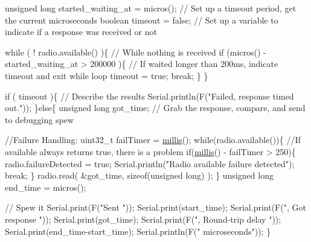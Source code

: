 \begin{DoxyCodeInclude}
    \textcolor{keywordtype}{unsigned} \textcolor{keywordtype}{long} started\_waiting\_at = micros();               \textcolor{comment}{// Set up a timeout period, get the current
       microseconds}
    \textcolor{keywordtype}{boolean} timeout = \textcolor{keyword}{false};                                   \textcolor{comment}{// Set up a variable to indicate if a
       response was received or not}
    
    \textcolor{keywordflow}{while} ( ! radio.available() )\{                             \textcolor{comment}{// While nothing is received}
      \textcolor{keywordflow}{if} (micros() - started\_waiting\_at > 200000 )\{            \textcolor{comment}{// If waited longer than 200ms, indicate
       timeout and exit while loop}
          timeout = \textcolor{keyword}{true};
          \textcolor{keywordflow}{break};
      \}      
    \}
        
    \textcolor{keywordflow}{if} ( timeout )\{                                             \textcolor{comment}{// Describe the results}
        Serial.println(F(\textcolor{stringliteral}{"Failed, response timed out."}));
    \}\textcolor{keywordflow}{else}\{
        \textcolor{keywordtype}{unsigned} \textcolor{keywordtype}{long} got\_time;                                 \textcolor{comment}{// Grab the response, compare, and send to
       debugging spew}
        
        \textcolor{comment}{//Failure Handling:}
        uint32\_t failTimer = \hyperlink{group__Porting__General_gad5b3ec1ce839fa1c4337a7d0312e9749}{millis}();
        \textcolor{keywordflow}{while}(radio.available())\{                               \textcolor{comment}{//If available always returns true, there
       is a problem}
          \textcolor{keywordflow}{if}(\hyperlink{group__Porting__General_gad5b3ec1ce839fa1c4337a7d0312e9749}{millis}() - failTimer > 250)\{
            radio.failureDetected = \textcolor{keyword}{true};
            Serial.println(\textcolor{stringliteral}{"Radio available failure detected"});
            \textcolor{keywordflow}{break};
          \}
          radio.read( &got\_time, \textcolor{keyword}{sizeof}(\textcolor{keywordtype}{unsigned} \textcolor{keywordtype}{long}) );
        \}
        \textcolor{keywordtype}{unsigned} \textcolor{keywordtype}{long} end\_time = micros();
        
        \textcolor{comment}{// Spew it}
        Serial.print(F(\textcolor{stringliteral}{"Sent "}));
        Serial.print(start\_time);
        Serial.print(F(\textcolor{stringliteral}{", Got response "}));
        Serial.print(got\_time);
        Serial.print(F(\textcolor{stringliteral}{", Round-trip delay "}));
        Serial.print(end\_time-start\_time);
        Serial.println(F(\textcolor{stringliteral}{" microseconds"}));
    \}


\end{DoxyCodeInclude}

